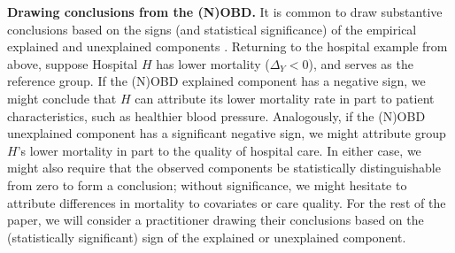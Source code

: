 \textbf{Drawing conclusions from the (N)OBD.}
It is common to draw substantive conclusions based on the signs (and statistical significance) of the empirical explained and unexplained components \citep{oaxacaRansom1998, jann2008,fortinLemieuxFirpo2011}. Returning to the hospital example from above, suppose Hospital $H$ has lower mortality ($\Delta_Y < 0$), and serves as the reference group. 
If the (N)OBD explained component has a negative sign, we might conclude that $H$ can attribute
its lower mortality rate in part to patient characteristics, such as healthier blood pressure. 
Analogously, if the (N)OBD unexplained component has a significant negative sign, we might attribute group $H$'s lower
mortality in part to the quality of hospital care.
In either case, we might also require that the observed components be statistically distinguishable from zero to form a conclusion; without significance, we might hesitate to attribute differences in mortality to covariates or care quality. 
For the rest of the paper, we will consider a practitioner drawing their conclusions based on the (statistically significant) sign of the explained or unexplained component.
